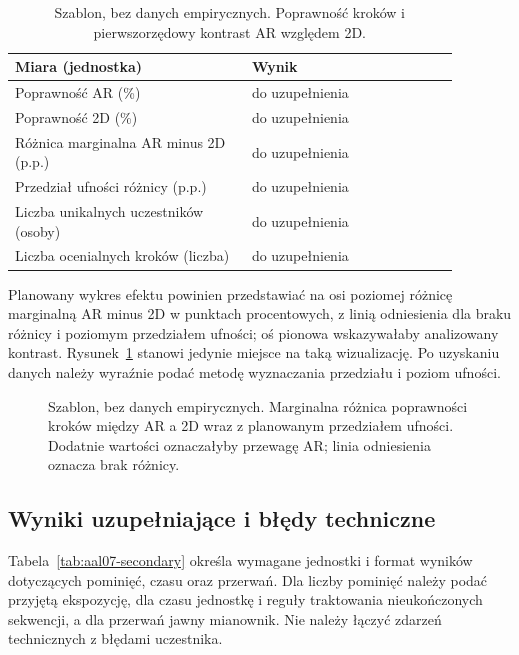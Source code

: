 \documentclass[11pt,a4paper]{article}
\begin{document}
\begin{table}[htbp]
\centering
\small
\caption{Szablon, bez danych empirycznych. Poprawność kroków i pierwszorzędowy kontrast AR względem 2D.}
\label{tab:aal07-primary}
\begin{tabular}{p{0.47\linewidth}p{0.41\linewidth}}
\hline
Miara (jednostka) & Wynik \\
\hline
Poprawność AR (\%) & do uzupełnienia \\
Poprawność 2D (\%) & do uzupełnienia \\
Różnica marginalna AR minus 2D (p.p.) & do uzupełnienia \\
Przedział ufności różnicy (p.p.) & do uzupełnienia \\
Liczba unikalnych uczestników (osoby) & do uzupełnienia \\
Liczba ocenialnych kroków (liczba) & do uzupełnienia \\
\hline
\end{tabular}
\end{table}

Planowany wykres efektu powinien przedstawiać na osi poziomej różnicę marginalną AR minus 2D w punktach procentowych, z linią odniesienia dla braku różnicy i poziomym przedziałem ufności; oś pionowa wskazywałaby analizowany kontrast. Rysunek~\ref{fig:aal07-effect} stanowi jedynie miejsce na taką wizualizację. Po uzyskaniu danych należy wyraźnie podać metodę wyznaczania przedziału i poziom ufności.

\begin{figure}[htbp]
\centering
{}
\caption{Szablon, bez danych empirycznych. Marginalna różnica poprawności kroków między AR a 2D wraz z planowanym przedziałem ufności. Dodatnie wartości oznaczałyby przewagę AR; linia odniesienia oznacza brak różnicy.}
\label{fig:aal07-effect}
\end{figure}

\subsection{Wyniki uzupełniające i błędy techniczne}
Tabela~\ref{tab:aal07-secondary} określa wymagane jednostki i format wyników dotyczących pominięć, czasu oraz przerwań. Dla liczby pominięć należy podać przyjętą ekspozycję, dla czasu jednostkę i reguły traktowania nieukończonych sekwencji, a dla przerwań jawny mianownik. Nie należy łączyć zdarzeń technicznych z błędami uczestnika.
\end{document}
